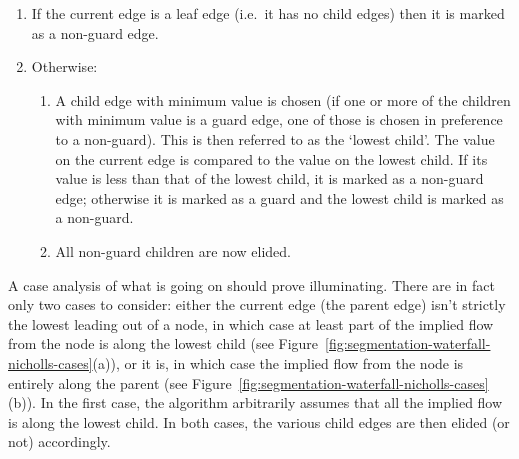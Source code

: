 \begin{enumerate}

\item If the current edge is a leaf edge (i.e.~it has no child edges) then it is marked as a non-guard edge.

\item Otherwise:

\begin{enumerate}

\item A child edge with minimum value is chosen (if one or more of the children with minimum value is a guard edge, one of those is chosen in preference to a non-guard). This is then referred to as the `lowest child'. The value on the current edge is compared to the value on the lowest child. If its value is less than that of the lowest child, it is marked as a non-guard edge; otherwise it is marked as a guard and the lowest child is marked as a non-guard.

\item All non-guard children are now elided.

\end{enumerate}

\end{enumerate}

A case analysis of what is going on should prove illuminating. There are in fact only two cases to consider: either the current edge (the parent edge) isn't strictly the lowest leading out of a node, in which case at least part of the implied flow from the node is along the lowest child (see Figure~\ref{fig:segmentation-waterfall-nicholls-cases}(a)), or it is, in which case the implied flow from the node is entirely along the parent (see Figure~\ref{fig:segmentation-waterfall-nicholls-cases}(b)). In the first case, the algorithm arbitrarily assumes that all the implied flow is along the lowest child. In both cases, the various child edges are then elided (or not) accordingly.

